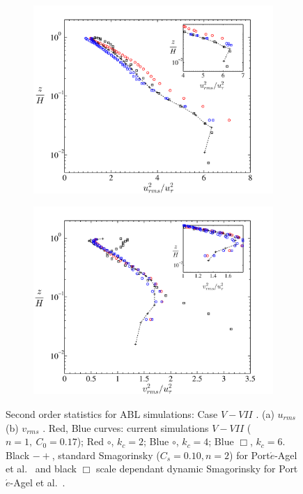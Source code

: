 \begin{figure}
\centering
        \begin{subfigure}[t]{0.75\textwidth}
                \includegraphics[width=\linewidth]{Fig3/urms_filter_n1.pdf}
                \caption{}
                \label{fig:urms1a}
        \end{subfigure}
        \centering
        \begin{subfigure}[t]{0.75\textwidth}
                \includegraphics[width=\linewidth]{Fig3/vrms_filter_n1.pdf}
                \caption{}
                \label{fig:vrms1a}
        \end{subfigure}
        \caption[Second order statistics $u_{rms}, \ v_{rms}$, Case $V-VII$]{Second order statistics for ABL simulations: Case $V-VII$ . (a) $u_{rms}$ (b) $v_{rms}$ . Red, Blue curves: current simulations $V-VII$ ($n = 1, \ C_0 = 0.17$);  Red $\circ$, $k_{c}=2$; Blue $\circ$, $k_{c} = 4$; Blue $\Box$, $k_{c} = 6$.  Black $-+$, standard Smagorinsky ($C_s = 0.10, n = 2$) {for Port$\acute{e}$-Agel et al.~\cite{porte1fun}} and black $\Box$ scale dependant dynamic Smagorinsky for Port$\acute{e}$-Agel et al.~\cite{porte1fun}. }\label{fig:stat021a}
\end{figure}
